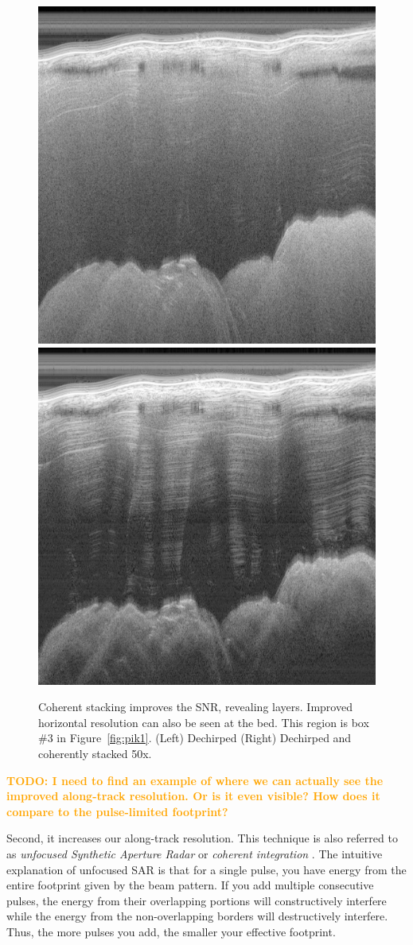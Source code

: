\documentclass[11pt]{article}
\newcommand{\future}[1]{\ifthenelse{\boolean{include-future}} {\textcolor{Orange}{\textbf{TODO: #1}}}{}}
\newcommand{\figref}[1]{Figure~\ref{#1}}
\begin{document}
\begin{figure}[ht!]
\centering
\includegraphics[width=0.48\columnwidth]{figures/TOT_filtered_zoom2_small.jpg}
\includegraphics[width=0.48\columnwidth]{figures/TOT_costacked_zoom2_small.jpg}
\caption[]{Coherent stacking improves the SNR, revealing layers. Improved horizontal resolution can also be seen at the bed. This region is box \#3 in \figref{fig:pik1}. (Left) Dechirped (Right) Dechirped and coherently stacked 50x.}
\end{figure}

\future{I need to find an example of where we can actually see the improved along-track resolution. Or is it even visible? How does it compare to the pulse-limited footprint?}

Second, it increases our along-track resolution. This technique is also referred to as \emph{unfocused Synthetic Aperture Radar} or \emph{coherent integration} \cite{Peters2005}.
The intuitive explanation of unfocused SAR is that for a single pulse, you have energy from the entire footprint given by the beam pattern. 
If you add multiple consecutive pulses, the energy from their overlapping portions will constructively interfere while the energy from the non-overlapping borders will destructively interfere. 
Thus, the more pulses you add, the smaller your effective footprint. 
\end{document}
